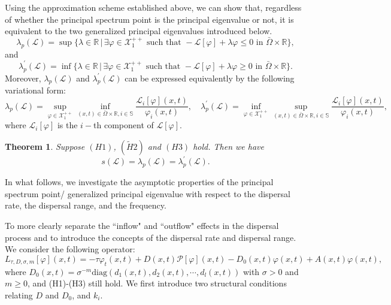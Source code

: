 \documentclass[11pt,reqno]{amsart}
\newtheorem{theorem}{Theorem}[section]
\numberwithin{equation}{section}
\begin{document}
Using the approximation scheme established above, we can show that, regardless of whether the principal spectrum point is the principal eigenvalue or not, it is equivalent to the two generalized principal eigenvalues introduced below.
\begin{equation*}
\lambda_{p}(\mathcal{L}) = \sup \{\lambda\in\mathbb{R} \,|\, \exists \varphi\in\mathcal{X}^{++}_{1}\text{ such that }
-\mathcal{L}[\varphi] + \lambda\varphi   \leq 0 \text{ in } \bar{\Omega}\times\mathbb{R}  \},
\end{equation*}
and
\begin{equation*}
\lambda_{p}^{\prime}(\mathcal{L}) =\inf \{\lambda\in\mathbb{R} \,|\, \exists \varphi\in\mathcal{X}^{++}_{1}\text{ such that }
-\mathcal{L}[\varphi] + \lambda\varphi   \geq 0 \text{ in } \bar{\Omega}\times\mathbb{R}  \}.
\end{equation*}
Moreover, $\lambda_{p}(\mathcal{L})$ and $\lambda_{p}^{\prime}(\mathcal{L})$ can be expressed equivalently by the following variational form:
\begin{equation*}
\lambda_{p}(\mathcal{L}) =
\sup_{\varphi \in \mathcal{X}^{++}_{1}}
\inf_{  (x,t)\in\bar{\Omega} \times \mathbb{R},i\in\mathbb{S} }
\frac{\mathcal{L}_{i}[\varphi](x,t)}{\varphi_{i}(x,t)},
\quad
\lambda_{p}^{\prime}(\mathcal{L}) =
\inf_{\varphi \in \mathcal{X}^{++}_{1}}
\sup_{  (x,t)\in\bar{\Omega} \times \mathbb{R},i\in\mathbb{S} }
\frac{\mathcal{L}_{i}[\varphi](x,t)}{\varphi_{i}(x,t)},
\end{equation*}
where $\mathcal{L}_{i}[\varphi]$ is the $i-$th component of $\mathcal{L}[\varphi]$.


\begin{theorem}\label{THM1.6}
Suppose $(H1)$, $(\tilde{H}2)$ and $(H3)$ hold. Then we have
\begin{equation*}
s(\mathcal{L})=\lambda_{p}(\mathcal{L})=\lambda_{p}^{\prime}(\mathcal{L}).
\end{equation*}
\end{theorem}


In what follows, we investigate the asymptotic properties of the principal spectrum point/ generalized principal eigenvalue with respect to the dispersal rate, the dispersal range, and the frequency.

To more clearly separate the ``inflow"  and ``outflow"  effects in the dispersal process and to introduce the concepts of the dispersal rate and dispersal range.
We consider the following operator:
\begin{equation*}
L_{\tau,D,\sigma,m}[\varphi](x,t) = -\tau\varphi_{t}(x,t)+D(x,t)\mathcal{P}[\varphi](x,t) - D_{0}(x,t)\varphi(x,t) + A(x,t)\varphi(x,t),
\end{equation*}
where
$D_{0}(x,t) = \sigma^{-m} \text{diag}\left( d_{1}(x,t), d_{2}(x,t), \cdots, d_{l}(x,t) \right) $
with $\sigma>0$ and $m\geq 0$, and (H1)-(H3) still hold.
We first introduce two structural conditions relating  $D$ and $D_{0}$, and $k_i$.
\end{document}

